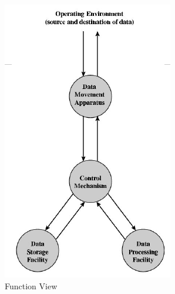 \documentclass[9pt,twocolumn]{article}
\begin{document}
    \begin{figure}[h]
      \centering
      \includegraphics[scale=0.6]{./assets/001/fxn-view.png}
      \caption{Function View}
    \end{figure}
\end{document}
